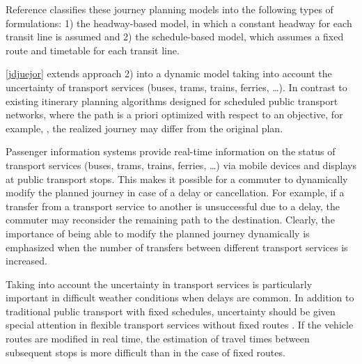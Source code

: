 \documentclass[dissertation,draft*]{aaltoseries}
\begin{document}
Reference \cite{zografos} classifies these journey planning models into
the following types of formulations: 1) the headway-based model, in which
a constant headway for each transit line is assumed \cite{wong1998}
and 2) the schedule-based model, which assumes a
fixed route and timetable for each transit line.

\ref{jdjuejor} extends approach 2) into a dynamic model taking into account the 
uncertainty of transport services (buses, trams, trains, ferries, \ldots). 
In contrast to existing itinerary planning algorithms designed for scheduled public transport networks, 
where the path is a priori optimized with respect to an objective, for example,
\cite{zografos, androutsopoulos}, the realized journey may differ from the original plan. 

Passenger information systems provide real-time information on the status of transport services 
(buses, trams, trains, ferries, \ldots) via 
mobile devices %
and displays at public transport stops. 
This makes it possible for a commuter to
dynamically modify the planned journey in case of a delay or cancellation.
For example, if a transfer from a transport service
to another is unsuccessful due to a delay, the commuter may reconsider the 
remaining path to the destination. 
Clearly, the importance of being able to modify the planned journey dynamically
is emphasized when the number of transfers between different transport services is increased.

Taking into account the uncertainty in transport services is particularly important in difficult weather conditions
when delays are common. In addition to traditional public transport with fixed schedules, uncertainty 
should be given special attention in flexible transport 
services without fixed routes \cite{mulley}. If the vehicle routes are modified 
in real time, the estimation of travel times between subsequent stops is more difficult than in the case
of fixed routes.
\end{document}
